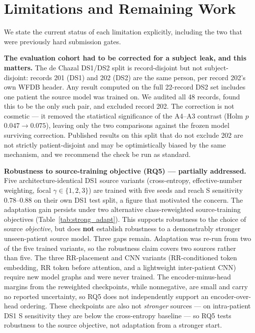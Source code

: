 \section{Limitations and Remaining Work}
\label{sec:limitations}

We state the current status of each limitation explicitly, including the two that
were previously hard submission gates.

\textbf{The evaluation cohort had to be corrected for a subject leak, and this
matters.} The de Chazal DS1/DS2 split is record-disjoint but not
subject-disjoint: records 201 (DS1) and 202 (DS2) are the same person, per
record 202's own WFDB header. Any result computed on the full 22-record DS2 set
includes one patient the source model was trained on. We audited all 48 records,
found this to be the only such pair, and excluded record 202. The correction is
not cosmetic --- it removed the statistical significance of the A4--A3 contrast
(Holm $p$ $0.047 \to 0.075$), leaving only the two comparisons against the frozen
model surviving correction. Published results on this split that do not exclude
202 are not strictly patient-disjoint and may be optimistically biased by the
same mechanism, and we recommend the check
be run as standard.

\begin{sloppypar}
\textbf{Robustness to source-training objective (RQ5) --- partially addressed.}
Five architecture-identical DS1 source variants (cross-entropy, effective-number
weighting, focal $\gamma\in\{1,2,3\}$) are trained with five seeds and reach
S sensitivity $0.78$--$0.88$ on their own DS1 test split, a figure that motivated
the concern. The adaptation gain persists under two alternative
class-reweighted source-training objectives (Table~\ref{tab:strong_adapt}).
This supports robustness to the choice of source \emph{objective}, but does
\textbf{not} establish robustness to a demonstrably stronger unseen-patient
source model. Three gaps remain.
Adaptation was re-run from two of the five trained
variants, so the robustness claim covers two sources rather than five. The three
RR-placement and CNN variants (RR-conditioned token embedding, RR token before
attention, and a lightweight inter-patient CNN) require new model graphs and
were never trained. The encoder-minus-head margins from the reweighted
checkpoints, while nonnegative, are small and carry no reported uncertainty, so
RQ5 does not independently support an encoder-over-head ordering.
 These
checkpoints are also not \emph{stronger} sources --- on intra-patient DS1 S
sensitivity they are below the cross-entropy baseline --- so RQ5 tests
robustness to the source objective, not adaptation from a stronger start.
\end{sloppypar}

